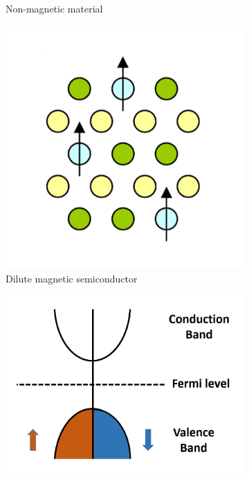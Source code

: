 \documentclass[main.tex]{subfiles}
\begin{document}
\begin{figure}[!htb]
\begin{subfigure}[h]{0.32\textwidth}
  		\caption{Non-magnetic material}
  		\label{fig:sub-second}
	\end{subfigure}
	\begin{subfigure}[h]{0.32\textwidth}
  		\centering
  		\includegraphics[width=\linewidth]{dms3}
  		\caption{Dilute magnetic semiconductor}
  		\label{fig:sub-second}
	\end{subfigure}
	\begin{subfigure}[h]{0.32\textwidth}
  		\centering
  		\includegraphics[width=\linewidth]{dos_intrinsic_semiconductor}

\end{subfigure}
\end{figure}
\end{document}
